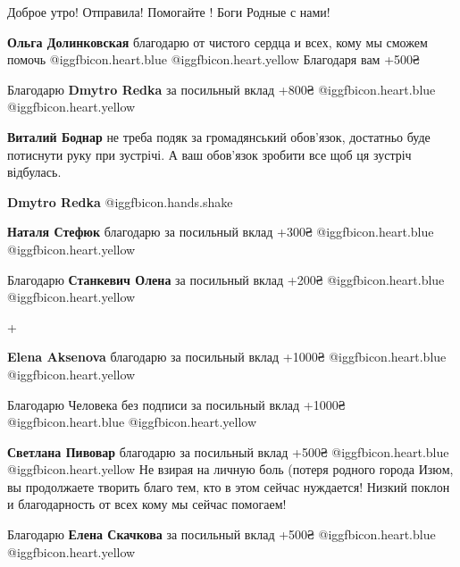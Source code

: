  
 
 
 
 
\zzSecCmt

\begin{itemize} %
Доброе утро! Отправила! Помогайте ! Боги Родные с нами!

\textbf{Ольга Долинковская} благодарю от чистого сердца и всех, кому мы сможем помочь @igg{fbicon.heart.blue}  @igg{fbicon.heart.yellow} 
Благодаря вам +500₴

Благодарю \textbf{Dmytro Redka} за посильный вклад +800₴ @igg{fbicon.heart.blue}  @igg{fbicon.heart.yellow} 

\textbf{Виталий Боднар} не треба подяк за громадянський обов'язок, достатньо буде потиснути руку при зустрічі. А ваш обов'язок зробити все щоб ця зустріч відбулась.

\textbf{Dmytro Redka}  @igg{fbicon.hands.shake} 

\textbf{Наталя Стефюк} благодарю за посильный вклад +300₴ @igg{fbicon.heart.blue}  @igg{fbicon.heart.yellow} 

Благодарю \textbf{Станкевич Олена} за посильный вклад +200₴ @igg{fbicon.heart.blue}  @igg{fbicon.heart.yellow} 

+

\textbf{Elena Aksenova} благодарю за посильный вклад +1000₴ @igg{fbicon.heart.blue}  @igg{fbicon.heart.yellow} 

Благодарю Человека без подписи за посильный вклад +1000₴ @igg{fbicon.heart.blue}  @igg{fbicon.heart.yellow} 

\textbf{Светлана Пивовар} благодарю за посильный вклад +500₴ @igg{fbicon.heart.blue}  @igg{fbicon.heart.yellow} 
Не взирая на личную боль (потеря родного города Изюм, вы продолжаете творить благо тем, кто в этом сейчас нуждается!
Низкий поклон и благодарность от всех кому мы сейчас помогаем!

Благодарю \textbf{Елена Скачкова} за посильный вклад +500₴ @igg{fbicon.heart.blue}  @igg{fbicon.heart.yellow} 


\end{itemize}
